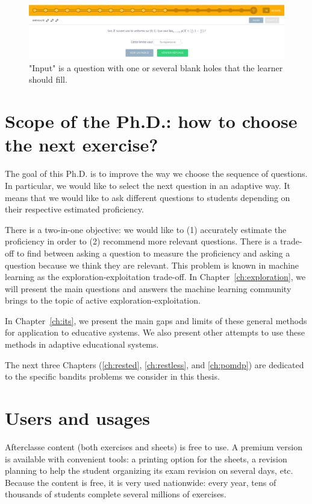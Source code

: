 \begin{figure}[ht]
\centering
\includegraphics[clip, width= \textwidth]{1literature/fig/input.png}
\caption{"Input" is a question with one or several blank holes that the learner should fill. }
\label{fig:input}
\end{figure}

\clearpage
\section{Scope of the Ph.D.: how to choose the next exercise?}
The goal of this Ph.D. is to improve the way we choose the sequence of questions. In particular, we would like to select the next question in an adaptive way. It means that we would like to ask different questions to students depending on their respective estimated proficiency. 

There is a two-in-one objective: we would like to (1) accurately estimate the proficiency in order to (2) recommend more relevant questions. There is a trade-off to find between asking a question to measure the proficiency and asking a question because we think they are relevant. This problem is known in machine learning as the exploration-exploitation trade-off. In Chapter~\ref{ch:exploration}, we will present the main questions and answers the machine learning community brings to the topic of active exploration-exploitation.

In Chapter~\ref{ch:its}, we present the main gaps and limits of these general methods for application to educative systems. We also present other attempts to use these methods in adaptive educational systems.

The next three Chapters (\ref{ch:rested}, \ref{ch:restless}, and \ref{ch:pomdp}) are dedicated to the specific bandits problems we consider in this thesis.

\section{Users and usages}
Afterclasse content (both exercises and sheets) is free to use. A premium version is available with convenient tools: a printing option for the sheets, a revision planning to help the student organizing its exam revision on several days, etc. Because the content is free, it is very used nationwide: every year, tens of thousands of students complete several millions of exercises.

